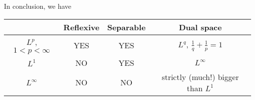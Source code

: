 In conclusion, we have\vspace{2mm}\\

\renewcommand{\arraystretch}{2}
\begin{tabular}{c|c|c|c}
	&Reflexive&Separable&Dual space\\
	\hline
	$L^p$, $1<p<\infty$&YES&YES&$L^q$, $\frac{1}{q}+\frac{1}{p}=1$\\
	\hline
	$L^1$&NO&YES&$L^\infty$\\
	\hline
	$L^\infty$&NO&NO& strictly (much!) bigger than $L^1$
\end{tabular}